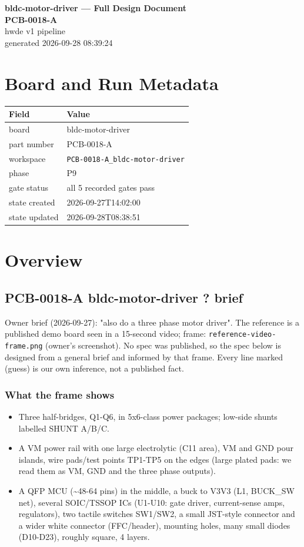 \documentclass[11pt,a4paper]{article}
\begin{document}
\sloppy
\begin{center}
{\LARGE\bfseries bldc-motor-driver --- Full Design Document}\\[6pt]
{\Large\bfseries PCB-0018-A}\\[6pt]
{\large hwde v1 pipeline}\\[2pt]
generated 2026-09-28 08:39:24
\end{center}
\tableofcontents

\section{Board and Run Metadata}
{\small
\begin{longtable}{lp{11cm}}
\toprule
\textbf{Field} & \textbf{Value} \\
\midrule
\endhead
board & bldc-motor-driver \\
part number & PCB-0018-A \\
workspace & \texttt{PCB-0018-A\_bldc-motor-driver} \\
phase & P9 \\
gate status & all 5 recorded gates pass \\
state created & 2026-09-27T14:02:00 \\
state updated & 2026-09-28T08:38:51 \\
\bottomrule
\end{longtable}
}
\section{Overview}
\subsection*{PCB-0018-A bldc-motor-driver ? brief}
Owner brief (2026-09-27): "also do a three phase motor driver". The reference is a published demo board seen in a 15-second video; frame: \texttt{reference-video-frame.png} (owner's screenshot). No spec was published, so the spec below is designed from a general brief and informed by that frame. Every line marked (guess) is our own inference, not a published fact.

\subsubsection*{What the frame shows}
\begin{itemize}
\item Three half-bridges, Q1-Q6, in 5x6-class power packages; low-side shunts labelled SHUNT A/B/C.
\item A VM power rail with one large electrolytic (C11 area), VM and GND pour islands, wire pads/test points TP1-TP5
on the edges (large plated pads: we read them as VM, GND and the three phase outputs).
\item A QFP MCU (\textasciitilde{}48-64 pins) in the middle, a buck to V3V3 (L1, BUCK\_SW net), several SOIC/TSSOP ICs (U1-U10:
gate driver, current-sense amps, regulators), two tactile switches SW1/SW2, a small JST-style connector and a
wider white connector (FFC/header), mounting holes, many small diodes (D10-D23), roughly square, 4 layers.
\end{itemize}
\end{document}

